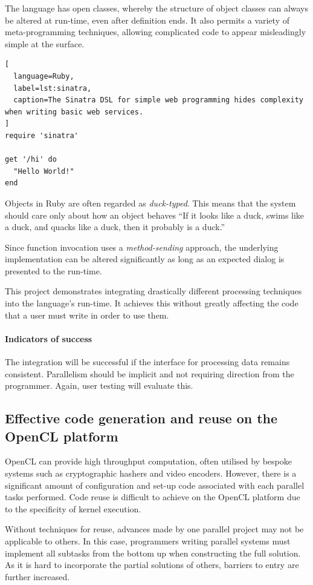 The language has open classes, whereby the structure of object classes can always be altered at run-time, even after definition ends. It also permits a variety of meta-programming techniques, allowing complicated code to appear misleadingly simple at the surface.

\begin{lstlisting}[
  language=Ruby,
  label=lst:sinatra,
  caption=The Sinatra DSL for simple web programming hides complexity when writing basic web services.
]
require 'sinatra'

get '/hi' do
  "Hello World!"
end
\end{lstlisting}

Objects in Ruby are often regarded as \emph{duck-typed}. This means that the system should care only about how an object behaves \textemdash{} ``If it looks like a duck, swims like a duck, and quacks like a duck, then it probably is a duck.''\cite{ducktest}

Since function invocation uses a \emph{method-sending} approach, the underlying implementation can be altered significantly as long as an expected dialog is presented to the run-time.

This project demonstrates integrating drastically different processing techniques into the language's run-time. It achieves this without greatly affecting the code that a user must write in order to use them.

\paragraph*{Indicators of success}
The integration will be successful if the interface for processing data remains consistent. Parallelism should be implicit and not requiring direction from the programmer. Again, user testing will evaluate this.

\subsection{Effective code generation and reuse on the OpenCL platform}
\ac{OpenCL} can provide high throughput computation, often utilised by bespoke systems such as cryptographic hashers and video encoders. However, there is a significant amount of configuration and set-up code associated with each parallel tasks performed. Code reuse is difficult to achieve on the \ac{OpenCL} platform due to the specificity of kernel execution.

Without techniques for reuse, advances made by one parallel project may not be applicable to others. In this case, programmers writing parallel systems must implement all subtasks from the bottom up when constructing the full solution. As it is hard to incorporate the partial solutions of others, barriers to entry are further increased.

